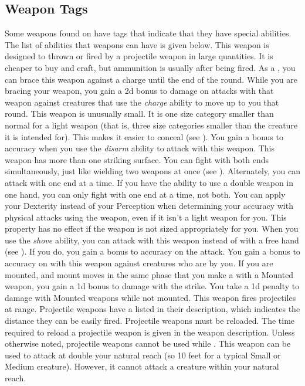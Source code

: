     \subsection{Weapon Tags}\label{Weapon Tags}
        Some weapons found on  have tags that indicate that they have special abilities. The list of abilities that weapons can have is given below.
         This weapon is designed to thrown or fired by a projectile weapon in large quantities. It is cheaper to buy and craft, but ammunition is usually  after being fired.
         As a , you can brace this weapon against a charge until the end of the round.
        While you are bracing your weapon, you gain a \plus2d bonus to damage on attacks with that weapon against creatures that use the \textit{charge} ability to move up to you that round.
         This weapon is unusually small. It is one size category smaller than normal for a light weapon (that is, three size categories smaller than the creature it is intended for). This makes it easier to conceal (see ).
         You gain a  bonus to accuracy when you use the \textit{disarm} ability to attack with this weapon.
         This weapon has more than one striking surface. You can fight with both ends simultaneously, just like wielding two weapons at once (see ). Alternately, you can attack with one end at a time. If you have the ability to use a double weapon in one hand, you can only fight with one end at a time, not both.
         You can apply your Dexterity instead of your Perception when determining your accuracy with physical attacks using the weapon, even if it isn't a light weapon for you.
        This property has no effect if the weapon is not sized appropriately for you.
         When you use the \textit{shove} ability, you can attack with this weapon instead of with a free hand (see ).
        If you do, you gain a  bonus to accuracy on the attack.
         You gain a  bonus to accuracy on  with this weapon against creatures who are  by you.
        \label{Mounted Weapon} If you are mounted, and mount moves in the same phase that you make a  with a Mounted weapon, you gain a \plus1d bonus to damage with the strike.
        You take a \minus1d penalty to damage with Mounted weapons while not mounted.
         This weapon fires projectiles at range. Projectile weapons have a  listed in their description, which indicates the distance they can be easily fired. Projectile weapons must be reloaded. The time required to reload a projectile weapon is given in the weapon description.
        Unless otherwise noted, projectile weapons cannot be used while \prone.
        \label{Reach Weapon} This weapon can be used to attack at double your natural reach (so 10 feet for a typical Small or Medium creature). However, it cannot attack a creature within your natural reach.

